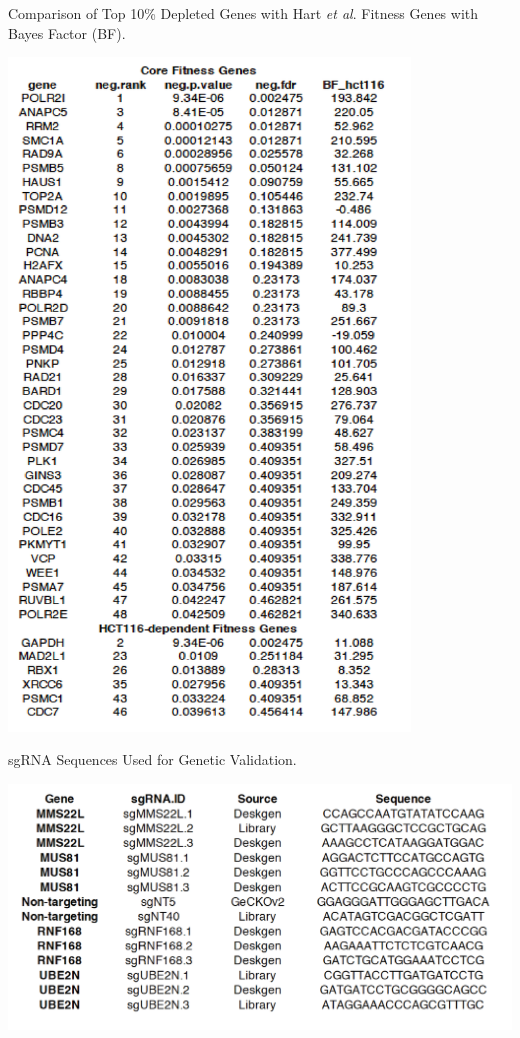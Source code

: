 \begin{table}
\caption{Comparison of Top 10\% Depleted Genes with Hart \textit{et al}. Fitness Genes with Bayes Factor (BF).}
\centering
\includegraphics[width=0.8\textwidth]{supplement/tables/fitness_genes_depleted.png}
\label{table:fitness_genes}
\end{table}

\begin{table}
\caption{sgRNA Sequences Used for Genetic Validation.}
\centering
\includegraphics[width=1\textwidth]{supplement/tables/STable_sgRNA_sequences}
\label{table:sgRNA_sequences}
\end{table}

